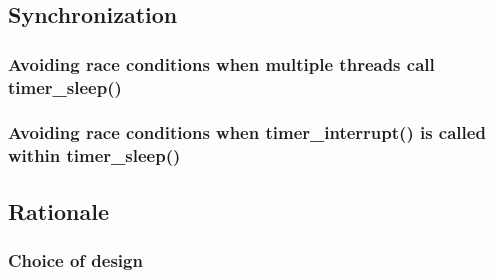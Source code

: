 \documentclass{article}
\begin{document}
\subsection{Synchronization}
\subsubsection{Avoiding race conditions when multiple threads call timer\_sleep()}
\subsubsection{Avoiding race conditions when timer\_interrupt() is called within timer\_sleep()}
\subsection{Rationale}
\subsubsection{Choice of design}



\end{document}
